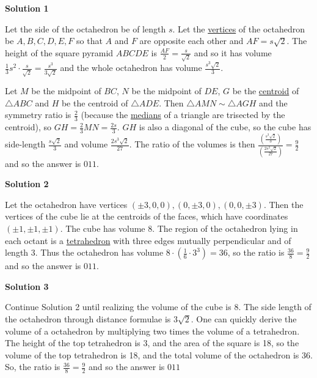 \begin{enumerate}
\textbf{Solution 1}

Let the side of the octahedron be of length $s$.  Let the \href{https://artofproblemsolving.com/wiki/index.php?title=Vertex}{vertices} of the octahedron be $A, B, C, D, E, F$ so that $A$ and $F$ are opposite each other and $AF = s\sqrt2$.  The height of the square pyramid $ABCDE$ is $\frac{AF}2 = \frac s{\sqrt2}$ and so it has volume $\frac 13 s^2 \cdot \frac s{\sqrt2} = \frac {s^3}{3\sqrt2}$ and the whole octahedron has volume $\frac {s^3\sqrt2}3$.  

 Let $M$ be the midpoint of $BC$, $N$ be the midpoint of $DE$, $G$ be the \href{https://artofproblemsolving.com/wiki/index.php?title=Centroid}{centroid} of $\triangle ABC$ and $H$ be the centroid of $\triangle ADE$.  Then $\triangle AMN \sim \triangle AGH$ and the symmetry ratio is $\frac 23$ (because the \href{https://artofproblemsolving.com/wiki/index.php?title=Triangle\_median}{medians} of a triangle are trisected by the centroid), so $GH = \frac{2}{3}MN = \frac{2s}3$.  $GH$ is also a diagonal of the cube, so the cube has side-length $\frac{s\sqrt2}3$ and volume $\frac{2s^3\sqrt2}{27}$.  The ratio of the volumes is then $\frac{\left(\frac{s^3\sqrt2}{3}\right)}{\left(\frac{2s^3\sqrt2}{27}\right)} = \frac92$ and so the answer is $\boxed{011}$.

 



\textbf{Solution 2}

Let the octahedron have vertices $(\pm 3, 0, 0), (0, \pm 3, 0), (0, 0, \pm 3)$.  Then the vertices of the cube lie at the centroids of the faces, which have coordinates $(\pm 1, \pm 1, \pm 1)$.  The cube has volume 8.  The region of the octahedron lying in each octant is a \href{https://artofproblemsolving.com/wiki/index.php?title=Tetrahedron}{tetrahedron} with three edges mutually perpendicular and of length 3.  Thus the octahedron has volume $8 \cdot \left(\frac 16 \cdot3^3\right) = 36$, so the ratio is $\frac {36}{8} = \frac 92$ and so the answer is $\boxed{011}$.

 



\textbf{Solution 3}

Continue Solution 2 until realizing the volume of the cube is 8. The side length of the octahedron through distance formulae is $3\sqrt{2}$. One can quickly derive the volume of a octahedron by multiplying two times the volume of a tetrahedron. The height of the top tetrahedron is 3, and the area of the square is 18, so the volume of the top tetrahedron is 18, and the total volume of the octahedron is 36. So, the ratio is $\frac {36}{8} = \frac{9}{2}$ and so the answer is $\boxed{011}$




\end{enumerate}

